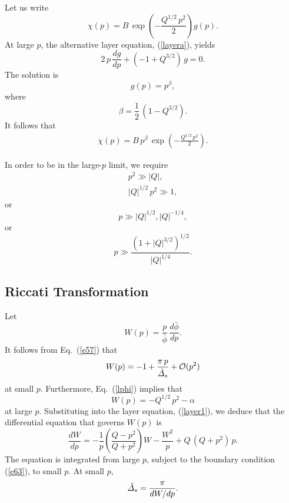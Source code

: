 \documentclass[titlepage=false,12pt]{article}
\begin{document}
Let us write
\begin{equation}
\chi(p) = B\,\exp\left(-\frac{Q^{1/2}\,p^2}{2}\right)g(p).
\end{equation}
At large $p$, the alternative layer equation, (\ref{layera}), yields
\begin{equation}
2\,p\,\frac{dg}{dp} +(-1+Q^{3/2})\,g = 0.
\end{equation}
The solution is
\begin{equation}
g(p)= p^{\beta},
\end{equation}
where
\begin{equation}
\beta = \frac{1}{2}\,(1-Q^{3/2}).
\end{equation}
It follows that
\begin{align}\label{e68}
\chi(p)= B\,p^{\beta}\,\exp\left(-\frac{Q^{1/2}\,p^2}{2}\right).
\end{align}

In order to be in the large-$p$ limit, we require
\begin{align}
p^2\gg |Q|,\\[0.5ex]
|Q|^{1/2}\,p^2\gg 1,
\end{align}
or
\begin{equation}
p\gg |Q|^{1/2}, |Q|^{-1/4},
\end{equation}
or
\begin{equation}
p \gg \frac{(1+|Q|^{3/2})^{1/2}}{|Q|^{1/4}}.
\end{equation}

\subsection{Riccati Transformation}
Let
\begin{equation}
W(p) = \frac{p}{\bar{\phi}}\,\frac{d\bar{\phi}}{dp}.
\end{equation}
It follows from Eq.~(\ref{e57}) that 
\begin{equation}
W(p) = -1 + \frac{\pi\,p}{\hat{\mit\Delta}_s}+{\cal O}(p^2)
\end{equation} 
at small $p$. Furthermore, Eq.~(\ref{lphi}) implies that 
\begin{equation}\label{e63}
W(p) = -Q^{1/2}\,p^2-\alpha
\end{equation}
at large $p$. Substituting into the layer equation, (\ref{layer1}), we deduce that the differential equation that governs $W(p)$ is
\begin{equation}\label{e72}
\frac{dW}{dp} = -\frac{1}{p}\left(\frac{Q-p^2}{Q+p^2}\right)W - \frac{W^2}{p} + Q\,(Q+p^2)\,p.
\end{equation}
The equation is integrated from large $p$, subject to the boundary condition (\ref{e63}), to small $p$. At small $p$, 
\begin{equation}\label{e73}
\hat{\mit\Delta}_s = \frac{\pi}{dW/dp}.
\end{equation}
\end{document}

